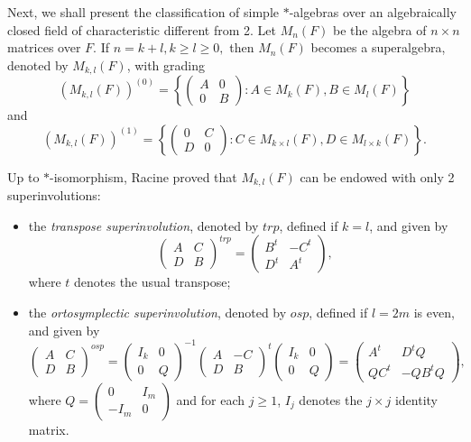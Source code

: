 \documentclass[11pt]{amsart}
\theoremstyle{definition}
\theoremstyle{remark}
\begin{document}
	Next, we shall present the classification of simple $*$-algebras over an algebraically closed field of characteristic different from 2. Let $M_n(F)$ be the algebra of $n\times n$ matrices over $F$. If $n=k+l, k\geq l\geq 0,$ then $M_n(F)$ becomes a superalgebra, denoted by $M_{k,l}(F)$, with grading $$(M_{k,l}(F))^{(0)}=\left\{\begin{pmatrix}
		A&0\\0&B
	\end{pmatrix}: A\in M_k(F), B\in M_l(F) \right\}$$ and $$(M_{k,l}(F))^{(1)}=\left\{\begin{pmatrix}
	0&C\\D&0
	\end{pmatrix}: C\in M_{k\times l}(F), D\in M_{l\times k}(F) \right\}.$$
	
	Up to $*$-isomorphism, Racine \cite{Racine} proved that $M_{k,l}(F)$ can be endowed with only 2 superinvolutions:
	
	\begin{itemize}
		\item[1.] the {\em transpose superinvolution}, denoted by $trp$, defined  if $k=l$, and given by $$\begin{pmatrix}
			A&C\\D&B
		\end{pmatrix}^{trp}=\begin{pmatrix}
		B^t&-C^t\\ D^t&A^t
		\end{pmatrix},$$ where $t$ denotes the usual transpose;
		\item[2.] the {\em ortosymplectic superinvolution}, denoted by $osp$, defined if $l=2m$ is even, and given by
		$$\begin{pmatrix}
			A&C\\D&B
		\end{pmatrix}^{osp}=\begin{pmatrix}
		I_k&0\\0&Q
		\end{pmatrix}^{-1}\begin{pmatrix}
		A&-C\\D&B 
		\end{pmatrix}^{t}\begin{pmatrix}
		I_k&0\\0&Q
		\end{pmatrix}=\begin{pmatrix}
		A^t&D^tQ\\ QC^t& -QB^tQ
		\end{pmatrix},$$ where $Q=\begin{pmatrix}
		0&I_m\\-I_m&0
		\end{pmatrix}$ and for each $j\ge 1$, $I_j$ denotes the $j\times j$ identity matrix.
		
	\end{itemize}
	
\end{document}
